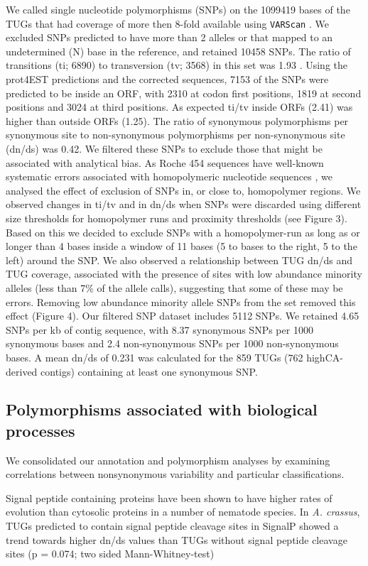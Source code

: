 \documentclass[10pt]{bmc_article}
\newenvironment{bmcformat}{\begin{raggedright}\baselineskip20pt\sloppy\setboolean{publ}{false}}{\end{raggedright}\baselineskip20pt\sloppy}
\begin{document}
\begin{bmcformat}
We called single nucleotide polymorphisms (SNPs) on the
1099419 bases of the TUGs that had coverage of more then
8-fold available using \texttt{VARScan} \cite{pmid19542151}. We
excluded SNPs predicted to have more than 2 alleles or that mapped to
an undetermined (N) base in the reference, and retained
10458 SNPs. The ratio of transitions (ti;
6890) to transversion (tv;
3568) in this set was
1.93 . Using the prot4EST
predictions and the corrected sequences, 7153 of
the SNPs were predicted to be inside an ORF, with
2310 at codon first positions,
1819 at second positions and 3024
at third positions. As expected ti/tv inside ORFs
(2.41) was higher than outside ORFs
(1.25). The ratio of synonymous polymorphisms per
synonymous site to non-synonymous polymorphisms per non-synonymous
site (dn/ds) was 0.42. We filtered these SNPs to exclude
those that might be associated with analytical bias. As Roche 454
sequences have well-known systematic errors associated with
homopolymeric nucleotide sequences \cite{pmid21685085}, we analysed
the effect of exclusion of SNPs in, or close to, homopolymer
regions. We observed changes in ti/tv and in dn/ds when SNPs were
discarded using different size thresholds for homopolymer runs and
proximity thresholds (see Figure 3). Based on this we decided to
exclude SNPs with a homopolymer-run as long as or longer than 4 bases
inside a window of 11 bases (5 to bases to the right, 5 to the left)
around the SNP. We also observed a relationship between TUG dn/ds and
TUG coverage, associated with the presence of sites with low abundance
minority alleles (less than 7\% of the allele calls), suggesting that
some of these may be errors.  Removing low abundance minority allele
SNPs from the set removed this effect (Figure 4).  Our filtered SNP
dataset includes 5112 SNPs. We retained
4.65 SNPs per kb of contig sequence, with
8.37 synonymous SNPs per 1000 synonymous bases and
2.4 non-synonymous SNPs per 1000 non-synonymous
bases. A mean dn/ds of 0.231 was
calculated for the 859 TUGs
(762 highCA-derived contigs)
containing at least one synonymous SNP.

\subsection*{Polymorphisms associated with biological processes}

We consolidated our annotation and polymorphism analyses by examining
correlations between nonsynonymous variability and particular
classifications.

Signal peptide containing proteins have been shown to have higher
rates of evolution than cytosolic proteins in a number of nematode
species. In \textit{A. crassus}, TUGs predicted to contain signal
peptide cleavage sites in SignalP showed a trend towards higher dn/ds
values than TUGs without signal peptide cleavage sites (p =
0.074; two sided
Mann-Whitney-test) %


\end{bmcformat}
\end{document}
